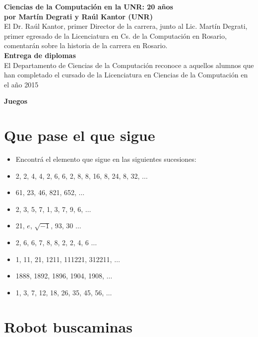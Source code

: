 \documentclass[12pt, a4paper]{article}
\newcommand{\charla}[3]{
	{\large\bf#1}\\
	{\bf por #2}\\
	#3\\
}
\begin{document}
\charla
{Ciencias de la Computación en la UNR: 20 años}
{Martín Degrati y Raúl Kantor (UNR)}
{El Dr. Raúl Kantor, primer Director de la carrera, junto al Lic. Martín Degrati, primer egresado de la Licenciatura en Cs. de la Computación en Rosario, comentarán sobre la historia de la carrera en Rosario.}

{\large\bf{Entrega de diplomas}}\\
{El Departamento de Ciencias de la Computación reconoce a aquellos alumnos que han completado el cursado de la Licenciatura en Ciencias de la Computación en el año 2015}

\newpage

\begin{center}\LARGE\bf Juegos\end{center}

\section*{Que pase el que sigue}
\begin{itemize}
\item Encontrá el elemento que sigue en las siguientes sucesiones:
\item 2, 2, 4, 4, 2, 6, 6, 2, 8, 8, 16, 8, 24, 8, 32, $\dots$
\item 61, 23, 46, 821, 652, $\dots$
\item 2, 3, 5, 7, 1, 3, 7, 9, 6, $\dots$
\item 21, $e$, $\sqrt{-1}$, 93, 30 $\dots$
\item 2, 6, 6, 7, 8, 8, 2, 2, 4, 6 $\dots$
\item 1, 11, 21, 1211, 111221, 312211, $\dots$
\item 1888, 1892, 1896, 1904, 1908, $\dots$
\item 1, 3, 7, 12, 18, 26, 35, 45, 56, $\dots$
\end{itemize}


\section*{Robot buscaminas}
\end{document}
